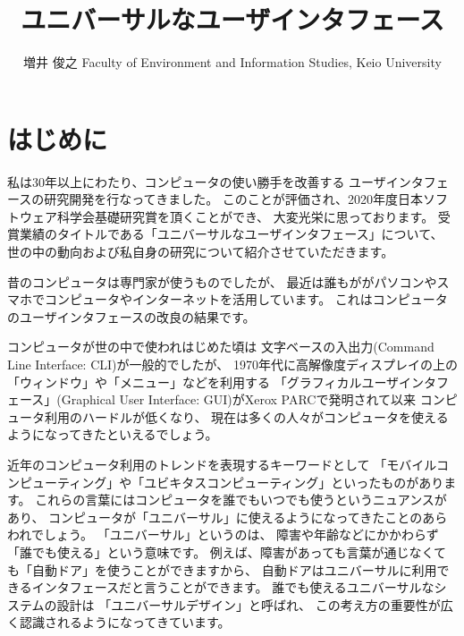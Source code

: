 \documentclass[topics]{compsoft} %
\begin{document}
\title{ユニバーサルなユーザインタフェース}

%
\author{増井 俊之
%
%
%
%
%
{Faculty of Environment and Information Studies, Keio University}
%
\shutten
%
%
}

%

\maketitle

\section{はじめに}

私は30年以上にわたり、コンピュータの使い勝手を改善する
ユーザインタフェースの研究開発を行なってきました。
このことが評価され、2020年度日本ソフトウェア科学会基礎研究賞を頂くことができ、
大変光栄に思っております。
受賞業績のタイトルである「ユニバーサルなユーザインタフェース」について、
世の中の動向および私自身の研究について紹介させていただきます。

昔のコンピュータは専門家が使うものでしたが、
最近は誰もががパソコンやスマホでコンピュータやインターネットを活用しています。
これはコンピュータのユーザインタフェースの改良の結果です。

コンピュータが世の中で使われはじめた頃は
文字ベースの入出力(Command Line Interface: CLI)が一般的でしたが、
1970年代に高解像度ディスプレイの上の
「ウィンドウ」や「メニュー」などを利用する
「グラフィカルユーザインタフェース」(Graphical User Interface: GUI)がXerox PARCで発明されて以来
コンピュータ利用のハードルが低くなり、
現在は多くの人々がコンピュータを使えるようになってきたといえるでしょう。

近年のコンピュータ利用のトレンドを表現するキーワードとして
「モバイルコンピューティング」や「ユビキタスコンピューティング」といったものがあります。
これらの言葉にはコンピュータを誰でもいつでも使うというニュアンスがあり、
コンピュータが「ユニバーサル」に使えるようになってきたことのあらわれでしょう。
%
「ユニバーサル」というのは、
障害や年齢などにかかわらず「誰でも使える」という意味です。
例えば、障害があっても言葉が通じなくても「自動ドア」を使うことができますから、
自動ドアはユニバーサルに利用できるインタフェースだと言うことができます。
%
誰でも使えるユニバーサルなシステムの設計は
「ユニバーサルデザイン」と呼ばれ、
この考え方の重要性が広く認識されるようになってきています。
\end{document}
